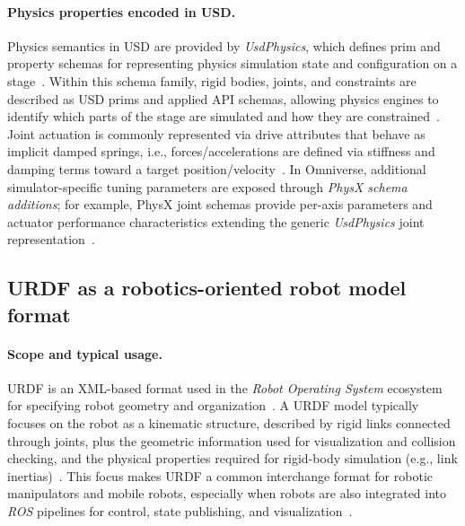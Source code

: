 \paragraph{Physics properties encoded in \acs{USD}.}
Physics semantics in \ac{USD} are provided by \emph{UsdPhysics}, which defines prim and property schemas for representing physics simulation state and configuration on a stage~\cite{openusd_usdphysics_schema}. Within this schema family, rigid bodies, joints, and constraints are described as \ac{USD} prims and applied \ac{API} schemas, allowing physics engines to identify which parts of the stage are simulated and how they are constrained~\cite{openusd_usdphysics_schema}. Joint actuation is commonly represented via drive attributes that behave as implicit damped springs, i.e., forces/accelerations are defined via stiffness and damping terms toward a target position/velocity~\cite{openusd_usdphysics_schema}. In Omniverse, additional simulator-specific tuning parameters are exposed through \emph{PhysX schema additions}; for example, PhysX joint schemas provide per-axis parameters and actuator performance characteristics extending the generic \emph{UsdPhysics} joint representation~\cite{omni_physics_physx_joint_schema}.

\subsection{\acs{URDF} as a robotics-oriented robot model format}
\paragraph{Scope and typical usage.}
\ac{URDF} is an \ac{XML}-based format used in the \emph{Robot Operating System} ecosystem for specifying robot geometry and organization~\cite{ros2_urdf_main}. A \ac{URDF} model typically focuses on the robot as a kinematic structure, described by rigid links connected through joints, plus the geometric information used for visualization and collision checking, and the physical properties required for rigid-body simulation (e.g., link inertias)~\cite{ros2_urdf_physical_properties}. This focus makes \ac{URDF} a common interchange format for robotic manipulators and mobile robots, especially when robots are also integrated into \emph{ROS} pipelines for control, state publishing, and visualization~\cite{ros2_urdf_main}.

